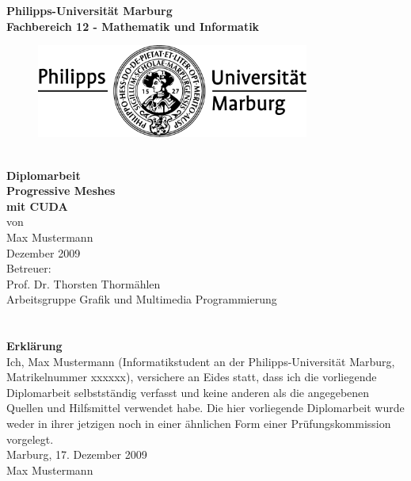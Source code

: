\documentclass[a4paper, 11pt,bibtotoc,abstracton]{scrreprt}
\begin{document}
\begin{titlepage}
\begin{center}
{\huge \textbf{Philipps-Universität Marburg}}\\[0.5cm]
\textbf{Fachbereich 12 - Mathematik und Informatik}\\[0.5cm]

\begin{figure}[h]
	\centering
		\includegraphics[width=0.8\textwidth]{fig/unilogo.pdf}
\end{figure}

{\huge \textbf{{\large \\[1cm]Diplomarbeit}}}
\\[1cm]

{\Huge \textbf{Progressive Meshes\\ mit CUDA}}
\\[1cm]

{\large von}\\
{\large Max Mustermann}\\
{\large Dezember 2009}\\[3cm]

{\large
Betreuer:\\ Prof. Dr. Thorsten Thormählen\\[1cm]
Arbeitsgruppe Grafik und Multimedia Programmierung}

\end{center}
\end{titlepage}
\newpage
\thispagestyle{empty}
\section*{}
\newpage
\thispagestyle{empty}
\vspace*{7cm}
\textbf{\Large {Erklärung}}\\[0.5cm]
Ich, Max Mustermann (Informatikstudent an der Philipps-Universität Marburg, Matrikelnummer
xxxxxx), versichere an Eides statt, dass ich die vorliegende Diplomarbeit selbstständig verfasst und keine anderen
als die angegebenen Quellen und Hilfsmittel verwendet habe. Die hier vorliegende Diplomarbeit wurde weder in ihrer jetzigen noch in einer ähnlichen Form einer Prüfungskommission vorgelegt.\\[1cm]
Marburg, 17. Dezember 2009\\[0.5cm]
Max Mustermann
\newpage
\shipout\null


  
\end{document}
